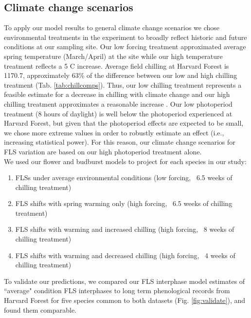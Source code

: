 \documentclass[11pt]{article}\usepackage[]{graphicx}\usepackage[]{color}
\begin{document}
\subsection*{Climate change scenarios}
\noindent To apply our model results to general climate change scenarios we chose environmental treatments in the experiment to broadly reflect historic and future conditions at our sampling site. Our low forcing treatment approximated average spring temperature (March/April) at the site while our high temperature treatment reflects a 5 \degree C increase. Average field chilling \citep[calculated from 15 October - 15 April, measured in Chill Hours,][]{Weinberger:1950aa} at Harvard Forest is 1170.7, approximately  63\% of the difference between our low and high chilling treatment (Tab. \ref{tab:chillcomps}). Thus, our low chilling treatment represents a feasible estimate for a decrease in chilling with climate change and our high chilling treatment approximates a reasonable increase \citep{Luedeling:2012aa}. Our low photoperiod treatment (8 hours of daylight) is well below the photoperiod experienced at Harvard Forest, but given that the photoperiod effects are expected to be small, we chose more extreme values in order to robustly estimate an effect (i.e., increasing statistical power). For this reason, our climate change scenarios for FLS variation are based on our high photoperiod treatment alone.\\


\noindent We used our flower and budburst models to project for each species in our study:
\begin{enumerate}
\item FLSs under average environmental conditions  (low forcing, ~6.5 weeks of chilling treatment)
\item FLS shifts with spring warming only (high forcing, ~6.5 weeks of chilling treatment)
\item FLS shifts with warming and increased chilling (high forcing, ~8 weeks of chilling treatment)
\item FLS shifts with warming and decreased chilling (high forcing, ~4 weeks of chilling treatment)
\end{enumerate}

\noindent To validate our predictions, we compared our FLS interphase model estimates of ``average" condition FLS interphases to long term phenological records from Harvard Forest \citep{OKeefe2015} for five species common to both datasets (Fig. \ref{fig:validate}), and found them comparable. \\
\end{document}
